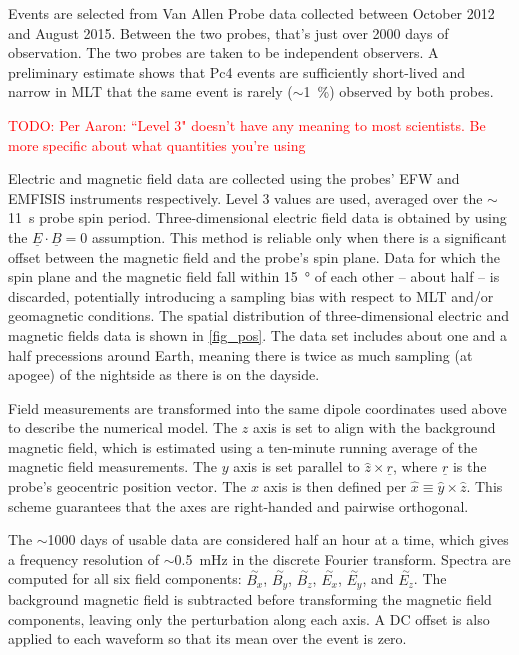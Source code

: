 \documentclass{article}
\newcommand{\about}{\ensuremath{\sim}}
\newcommand{\dft}[1]{\ensuremath{\overset{\sim}{#1}}\xspace}
\newcommand{\todo}[1]{ \textcolor{red}{TODO: #1} }
\newcommand{\x}{\ensuremath{x}\xspace}
\newcommand{\y}{\ensuremath{y}\xspace}
\newcommand{\z}{\ensuremath{z}\xspace}
\newcommand{\xhat}{\ensuremath{\hat{x}}\xspace}
\newcommand{\yhat}{\ensuremath{\hat{y}}\xspace}
\newcommand{\zhat}{\ensuremath{\hat{z}}\xspace}
\renewcommand{\vec}[1]{\ensuremath{\underline{#1}}}
\begin{document}
Events are selected from Van Allen Probe data collected between October 2012 and August 2015. Between the two probes, that's just over 2000 days of observation. The two probes are taken to be independent observers. A preliminary estimate shows that Pc4 events are sufficiently short-lived and narrow in MLT that the same event is rarely (\about\SI{1}{\percent}) observed by both probes.

\todo{Per Aaron: ``Level 3" doesn't have any meaning to most scientists. Be more specific about what quantities you're using}

Electric and magnetic field data are collected using the probes' EFW\cite{wygant_2013} and EMFISIS\cite{kletzing_2013} instruments respectively. Level 3 values are used, averaged over the \about\SI{11}{\second} probe spin period. Three-dimensional electric field data is obtained by using the $\vec{E} \cdot \vec{B} = 0$ assumption. This method is reliable only when there is a significant offset between the magnetic field and the probe's spin plane. Data for which the spin plane and the magnetic field fall within \SI{15}{\degree} of each other -- about half -- is discarded, potentially introducing a sampling bias with respect to MLT and/or geomagnetic conditions. The spatial distribution of three-dimensional electric and magnetic fields data is shown in \cref{fig_pos}. The data set includes about one and a half precessions around Earth, meaning there is twice as much sampling (at apogee) of the nightside as there is on the dayside.

Field measurements are transformed into the same dipole coordinates used above to describe the numerical model. The \z axis is set to align with the background magnetic field, which is estimated using a ten-minute running average of the magnetic field measurements. The \y axis is set parallel to $\zhat \times \vec{r}$, where \vec{r} is the probe's geocentric position vector. The \x axis is then defined per $\xhat \equiv \yhat \times \zhat$. This scheme guarantees that the axes are right-handed and pairwise orthogonal\cite{liu_2009}.

The \about1000 days of usable data are considered half an hour at a time, which gives a frequency resolution of \about\SI{0.5}{\mHz} in the discrete Fourier transform. Spectra are computed for all six field components: \dft{B_x}, \dft{B_y}, \dft{B_z}, \dft{E_x}, \dft{E_y}, and \dft{E_z}. The background
magnetic field is subtracted before transforming the magnetic field components, leaving only the perturbation along each axis. A DC offset is also applied to each waveform so that its mean over the event is zero.
\end{document}
